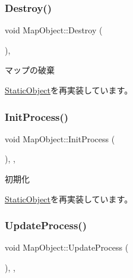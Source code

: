 \subsubsection{\texorpdfstring{Destroy()}{Destroy()}}
{\footnotesize\ttfamily void Map\+Object\+::\+Destroy (\begin{DoxyParamCaption}{ }\end{DoxyParamCaption})\hspace{0.3cm}{\ttfamily [final]}, {\ttfamily [virtual]}}



マップの破棄 



\mbox{\hyperlink{class_static_object_a8e9fb321b4f8f12c4bec1bc66853512f}{Static\+Object}}を再実装しています。

\mbox{\label{class_map_object_a3043cddb8aaad0eab27a076e9bee0284}} 
\subsubsection{\texorpdfstring{Init\+Process()}{InitProcess()}}
{\footnotesize\ttfamily void Map\+Object\+::\+Init\+Process (\begin{DoxyParamCaption}{ }\end{DoxyParamCaption})\hspace{0.3cm}{\ttfamily [final]}, {\ttfamily [protected]}, {\ttfamily [virtual]}}



初期化 



\mbox{\hyperlink{class_static_object_afa0709f50495338a23c1140062a567af}{Static\+Object}}を再実装しています。

\mbox{\label{class_map_object_ab6b8849f15175417eca94b2703945e4b}} 
\subsubsection{\texorpdfstring{Update\+Process()}{UpdateProcess()}}
{\footnotesize\ttfamily void Map\+Object\+::\+Update\+Process (\begin{DoxyParamCaption}{ }\end{DoxyParamCaption})\hspace{0.3cm}{\ttfamily [final]}, {\ttfamily [protected]}, {\ttfamily [virtual]}}



